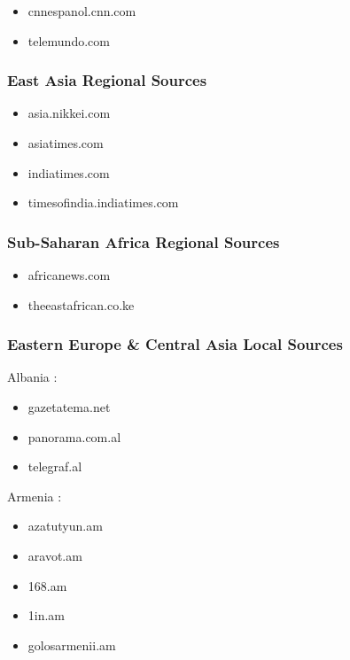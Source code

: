 \documentclass[
  letterpaper,
  DIV=11,
  numbers=noendperiod]{scrartcl}
\providecommand{\tightlist}{%
  \setlength{\itemsep}{0pt}\setlength{\parskip}{0pt}}\usepackage{longtable,booktabs,array}
\begin{document}
\begin{itemize}
\tightlist
\item
  cnnespanol.cnn.com
\item
  telemundo.com
\end{itemize}

\subsubsection{East Asia Regional
Sources}\label{east-asia-regional-sources}

\begin{itemize}
\tightlist
\item
  asia.nikkei.com
\item
  asiatimes.com
\item
  indiatimes.com
\item
  timesofindia.indiatimes.com
\end{itemize}

\subsubsection{Sub-Saharan Africa Regional
Sources}\label{sub-saharan-africa-regional-sources}

\begin{itemize}
\tightlist
\item
  africanews.com
\item
  theeastafrican.co.ke
\end{itemize}

\subsubsection{Eastern Europe \& Central Asia Local
Sources}\label{eastern-europe-central-asia-local-sources}

Albania :

\begin{itemize}
\tightlist
\item
  gazetatema.net
\item
  panorama.com.al
\item
  telegraf.al
\end{itemize}

Armenia :

\begin{itemize}
\tightlist
\item
  azatutyun.am
\item
  aravot.am
\item
  168.am
\item
  1in.am
\item
  golosarmenii.am
\end{itemize}
\end{document}
